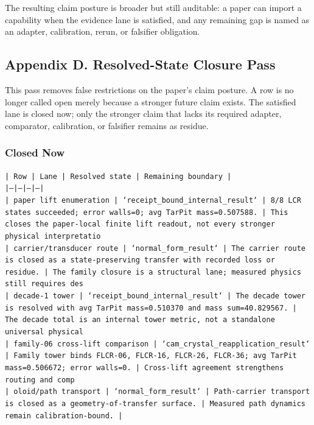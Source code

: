 \documentclass[11pt]{article}
\begin{document}
The resulting claim posture is broader but still auditable: a paper can import a capability when the evidence lane is satisfied, and any remaining gap is named as an adapter, calibration, rerun, or falsifier obligation.

\subsection*{Appendix D. Resolved-State Closure Pass}

This pass removes false restrictions on the paper's claim posture. A row is no longer called open merely because a stronger future claim exists. The satisfied lane is closed now; only the stronger claim that lacks its required adapter, comparator, calibration, or falsifier remains as residue.

\subsubsection*{Closed Now}

\noindent\texttt{| Row | Lane | Resolved state | Remaining boundary |}\\
\noindent\texttt{|---|---|---|---|}\\
\noindent\texttt{| paper lift enumeration | `receipt\_bound\_internal\_result` | 8/8 LCR states succeeded; error walls=0; avg TarPit mass=0.507588. | This closes the paper-local finite lift readout, not every stronger physical interpretatio}\\
\noindent\texttt{| carrier/transducer route | `normal\_form\_result` | The carrier route is closed as a state-preserving transfer with recorded loss or residue. | The family closure is a structural lane; measured physics still requires des}\\
\noindent\texttt{| decade-1 tower | `receipt\_bound\_internal\_result` | The decade tower is resolved with avg TarPit mass=0.510370 and mass sum=40.829567. | The decade total is an internal tower metric, not a standalone universal physical }\\
\noindent\texttt{| family-06 cross-lift comparison | `cam\_crystal\_reapplication\_result` | Family tower binds FLCR-06, FLCR-16, FLCR-26, FLCR-36; avg TarPit mass=0.506672; error walls=0. | Cross-lift agreement strengthens routing and comp}\\
\noindent\texttt{| oloid/path transport | `normal\_form\_result` | Path-carrier transport is closed as a geometry-of-transfer surface. | Measured path dynamics remain calibration-bound. |}\\
\end{document}
